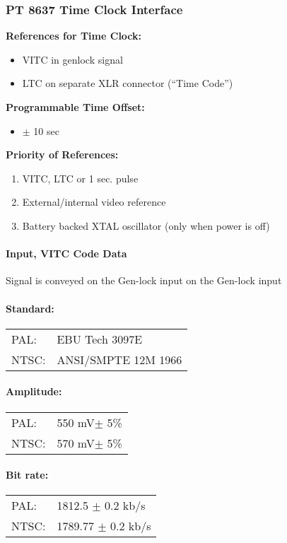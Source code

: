 \subsubsection{PT 8637 Time Clock Interface}
\textbf{References for Time Clock:}
\begin{itemize}
\item VITC in genlock signal
\item LTC on separate XLR connector (``Time Code'')
\end{itemize}

\textbf{Programmable Time Offset:}
\begin{itemize}
\item $\pm$ 10 sec
\end{itemize}

\textbf{Priority of References:}
\begin{enumerate}
\item VITC, LTC or 1 sec. pulse
\item External/internal video reference
\item Battery backed XTAL oscillator (only when power is off)
\end{enumerate}

\paragraph{Input, VITC Code Data}
Signal is conveyed on the Gen-lock input on the Gen-lock input

\paragraph{Standard:}
\begin{tabular}{l l}
PAL:		& EBU Tech 3097E \\
NTSC:		& ANSI/SMPTE 12M 1966 \\
\end{tabular}

\paragraph{Amplitude:}
\begin{tabular}{l l}
PAL:	& 550 mV$\pm$ 5\% \\
NTSC: & 570 mV$\pm$ 5\% \\
\end{tabular}

\paragraph{Bit rate:}
\begin{tabular}{l l}
PAL:		& 1812.5 $\pm$ 0.2 kb/s \\
NTSC:		& 1789.77 $\pm$ 0.2 kb/s \\
\end{tabular}

